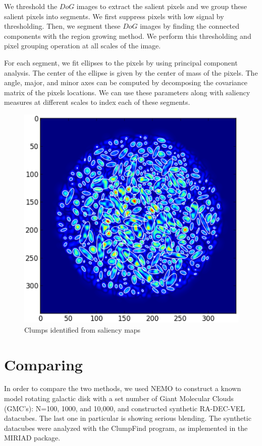 We threshold the $DoG$ images to extract the salient pixels and we group these salient pixels into segments.  We first suppress pixels with low signal by thresholding.  Then, we segment these $DoG$ images by finding the connected components with the region growing method. We perform this thresholding and pixel grouping operation at all scales of the image.

For each segment, we fit ellipses to the pixels by using principal component analysis.  The center of the ellipse is given by the center of mass of the pixels.  The angle, major, and minor axes can be computed by decomposing the covariance matrix of the pixels locations. We can use these parameters along with saliency measures at different scales to index each of these segments.

\begin{figure}[ht!]
\centering
\includegraphics[scale=0.5]{part9/Teuben_P059/s3-ell-0.eps}
\caption{Clumps identified from saliency maps}
\label{fig:teuben1}
\end{figure}


\section{Comparing}

In order to compare the two methods, we used NEMO \citep{nemo} to construct a known model rotating galactic disk with a set number of Giant Molecular Clouds (GMC's): N=100, 1000, and 10,000, and constructed synthetic RA-DEC-VEL datacubes. The last one in particular is showing serious blending. The synthetic datacubes were analyzed with the ClumpFind \citep{clumpfind} program, as implemented in the MIRIAD \citep{miriad} package.   

